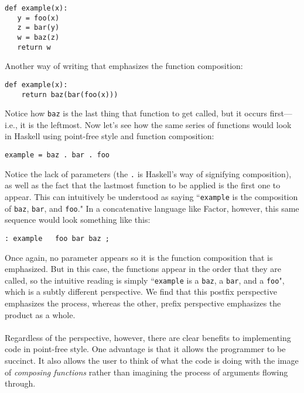 \documentclass{sig-alternate}
\begin{document}
\begin{verbatim}
def example(x):
   y = foo(x)
   z = bar(y)
   w = baz(z)
   return w
\end{verbatim}

Another way of writing that emphasizes the function composition: 
\begin{verbatim}
def example(x):
    return baz(bar(foo(x)))
\end{verbatim}

Notice how \texttt{baz} is the last thing that function to get called, but it occurs first---i.e., it is the leftmost. Now let's see how the same series of functions would look in Haskell using point-free style and function composition: 

\begin{verbatim}
example = baz . bar . foo
\end{verbatim}

Notice the lack of parameters (the \texttt{.} is Haskell's way of signifying composition), as well as the fact that the lastmost function to be applied is the first one to appear. This can intuitively be understood as saying ``\texttt{example} is the composition of \texttt{baz}, \texttt{bar}, and \texttt{foo}."  In a concatenative language like Factor, however, this same sequence would look something like this:

\begin{verbatim}
: example   foo bar baz ;
\end{verbatim}

Once again, no parameter appears so it is the function composition that is emphasized. But in this case, the functions appear in the order that they are called, so the intuitive reading is simply ``\texttt{example} is a \texttt{baz}, a \texttt{bar}, and a \texttt{foo}", which is a subtly different perspective. We find that this postfix perspective emphasizes the process, whereas the other, prefix perspective emphasizes the product as a whole. %
%
%
\\\\
Regardless of the perspective, however, there are clear benefits to implementing code in point-free style.  One advantage is that it allows the programmer to be succinct.  It also allows the user to think of what the code is doing with the image of \textit{composing functions} rather than imagining the process of arguments flowing through.
\end{document}
